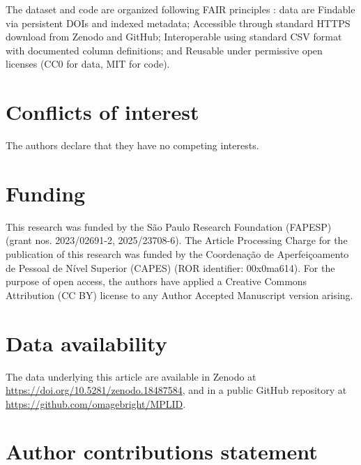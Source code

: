 \documentclass[unnumsec,webpdf,contemporary,large]{oup-authoring-template}
\begin{document}
The dataset and code are organized following FAIR principles \cite{wilkinson2016}: data are Findable via persistent DOIs and indexed metadata; Accessible through standard HTTPS download from Zenodo and GitHub; Interoperable using standard CSV format with documented column definitions; and Reusable under permissive open licenses (CC0 for data, MIT for code).


\section{Conflicts of interest}

The authors declare that they have no competing interests.


\section{Funding}

This research was funded by the S\~{a}o Paulo Research Foundation (FAPESP) (grant nos. 2023/02691-2, 2025/23708-6). The Article Processing Charge for the publication of this research was funded by the Coordena\c{c}\~{a}o de Aperfei\c{c}oamento de Pessoal de N\'{i}vel Superior (CAPES) (ROR identifier: 00x0ma614). For the purpose of open access, the authors have applied a Creative Commons Attribution (CC BY) license to any Author Accepted Manuscript version arising.


\section{Data availability}

The data underlying this article are available in Zenodo at \url{https://doi.org/10.5281/zenodo.18487584}, and in a public GitHub repository at \url{https://github.com/omagebright/MPLID}.


\section{Author contributions statement}
\end{document}
